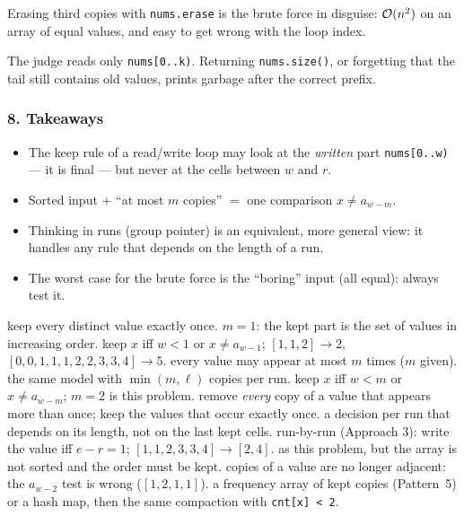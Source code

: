 \begin{warningbox}
Erasing third copies with \texttt{nums.erase} is the brute force in disguise: $\mathcal{O}(n^2)$ on an array of equal values, and easy to get wrong with the loop index.
\end{warningbox}

\begin{warningbox}
The judge reads only \texttt{nums[0..k)}. Returning \texttt{nums.size()}, or forgetting that the tail still contains old values, prints garbage after the correct prefix.
\end{warningbox}

\subsubsection*{8. Takeaways}

\begin{itemize}[leftmargin=*]
    \item The keep rule of a read/write loop may look at the \emph{written} part \texttt{nums[0..w)} --- it is final --- but never at the cells between $w$ and $r$.
    \item Sorted input $+$ ``at most $m$ copies'' $=$ one comparison $x \ne a_{w-m}$.
    \item Thinking in runs (group pointer) is an equivalent, more general view: it handles any rule that depends on the length of a run.
    \item The worst case for the brute force is the ``boring'' input (all equal): always test it.
\end{itemize}

\begin{variantsbox}
  {keep every distinct value exactly once.}
  {$m = 1$: the kept part is the set of values in increasing order.}
  {keep $x$ iff $w < 1$ or $x \ne a_{w-1}$; $[1,1,2] \to 2$, $[0,0,1,1,1,2,2,3,3,4] \to 5$.}
  {every value may appear at most $m$ times ($m$ given).}
  {the same model with $\min(m, \ell)$ copies per run.}
  {keep $x$ iff $w < m$ or $x \ne a_{w-m}$; $m = 2$ is this problem.}
  {remove \emph{every} copy of a value that appears more than once; keep the values that occur exactly once.}
  {a decision per run that depends on its length, not on the last kept cells.}
  {run-by-run (Approach 3): write the value iff $e - r = 1$; $[1,1,2,3,3,4] \to [2,4]$.}
  {as this problem, but the array is not sorted and the order must be kept.}
  {copies of a value are no longer adjacent: the $a_{w-2}$ test is wrong ($[1,2,1,1]$).}
  {a frequency array of kept copies (Pattern~5) or a hash map, then the same compaction with \texttt{cnt[x] < 2}.}
\end{variantsbox}
